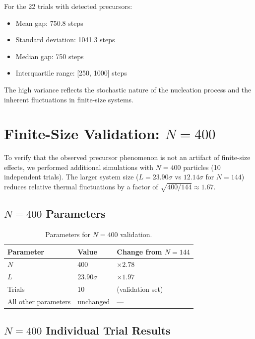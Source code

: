 \documentclass[11pt]{article}
\begin{document}
For the 22 trials with detected precursors:
\begin{itemize}
    \item Mean gap: 750.8 steps
    \item Standard deviation: 1041.3 steps
    \item Median gap: 750 steps
    \item Interquartile range: [250, 1000] steps
\end{itemize}

The high variance reflects the stochastic nature of the nucleation process and the inherent fluctuations in finite-size systems.

\section{Finite-Size Validation: $N=400$}

To verify that the observed precursor phenomenon is not an artifact of finite-size effects, we performed additional simulations with $N=400$ particles (10 independent trials). The larger system size ($L = 23.90\sigma$ vs $12.14\sigma$ for $N=144$) reduces relative thermal fluctuations by a factor of $\sqrt{400/144} \approx 1.67$.

\subsection{$N=400$ Parameters}

\begin{table}[h]
\centering
\caption{Parameters for $N=400$ validation.}
\label{tab:n400params}
\begin{tabular}{lll}
\toprule
\textbf{Parameter} & \textbf{Value} & \textbf{Change from $N=144$} \\
\midrule
$N$ & 400 & $\times 2.78$ \\
$L$ & 23.90$\sigma$ & $\times 1.97$ \\
Trials & 10 & (validation set) \\
All other parameters & unchanged & --- \\
\bottomrule
\end{tabular}
\end{table}

\subsection{$N=400$ Individual Trial Results}
\end{document}
